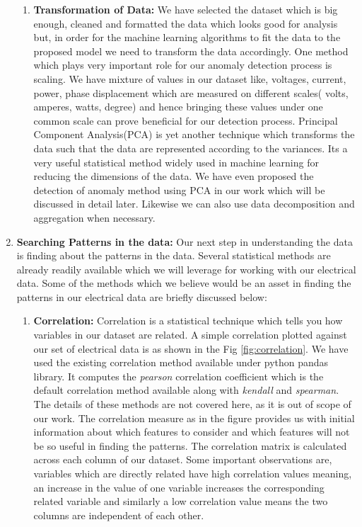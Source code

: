\begin{enumerate}
\begin{enumerate}
		\item\textbf{Transformation of Data:} We have selected the dataset which is big enough, cleaned and formatted the data which looks good for analysis but, in order for the machine learning algorithms to fit the data to the proposed model we need to transform the data accordingly. One method which plays very important role for our anomaly detection process is scaling. We have mixture of values in our dataset like, voltages, current, power, phase displacement which are measured on different scales( volts, amperes, watts, degree) and hence bringing these values under one common scale can prove beneficial for our detection process. Principal Component Analysis(PCA) is yet another technique which transforms the data such that the data are represented according to the variances. Its a very useful statistical method widely used in machine learning for reducing the dimensions of the data. We have even proposed the detection of anomaly method using PCA in our work which will be discussed in detail later. Likewise we can also use data decomposition and aggregation when necessary. 
	\end{enumerate}



\item\textbf{Searching Patterns in the data:} Our next step in understanding the data is finding about the patterns in the data. Several statistical methods are already readily available which we will leverage for working with our electrical data. Some of the methods which we believe would be an asset in finding the patterns in our electrical data are briefly discussed below:
\begin{enumerate}
\item\textbf{Correlation:} Correlation is a statistical technique which tells you how variables in our dataset are related. A simple correlation plotted against our set of electrical data is as shown in the Fig \ref{fig:correlation}. We have used the existing correlation method available under python pandas library. It computes the \textit{pearson} correlation coefficient which is the default correlation method available along with \textit{kendall} and \textit{spearman}. The details of these methods are not covered here, as it is out of scope of our work. The correlation measure as in the figure provides us with initial information about which features to consider and which features will not be so useful in finding the patterns. The correlation matrix is calculated across each column of our dataset. Some important observations are, variables which are directly related have high correlation values meaning, an increase in the value of one variable increases the corresponding related variable and similarly a low correlation value means the two columns are independent of each other. 


\end{enumerate}
\end{enumerate}
